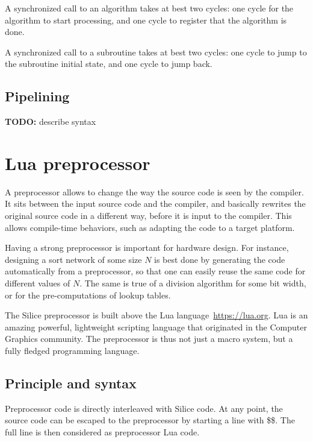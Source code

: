 \documentclass[a4]{article}
\newcommand\todo[1]{{\color{magenta}\textbf{TODO:} #1}}
\newcommand\silice{Silice}
\begin{document}
A synchronized call to an algorithm takes at best two cycles: one cycle for the algorithm to start processing, and one cycle to register that the algorithm is done.

A synchronized call to a subroutine takes at best two cycles: one cycle to jump to the subroutine initial state, and one cycle to jump back.


\subsection{Pipelining} 

\todo{describe syntax \ttfamily{\{ \} -> \{ \}}}


\section{Lua preprocessor}

A preprocessor allows to change the way the source code is seen by the compiler.
It sits between the input source code and the compiler, and basically rewrites the
original source code in a different way, before it is input to the compiler.
This allows compile-time behaviors, such as adapting the code to a target platform.

Having a strong preprocessor is important for hardware design. For instance,
designing a sort network of some size $N$ is best done by generating the code 
automatically from a preprocessor, so that one can easily reuse the
same code for different values of $N$. The same is true of a division 
algorithm for some bit width, or for the pre-computations of lookup tables.

The \silice{} preprocessor is built above the Lua language~\url{https://lua.org}. Lua is an amazing powerful, lightweight scripting language that originated in the Computer Graphics community. The preprocessor is thus not just a macro system, but a fully fledged programming language.

\subsection{Principle and syntax}

Preprocessor code is directly interleaved with Silice code. At any point, the source code can be escaped to the preprocessor by starting a line with \$\$. The full line is then considered as preprocessor Lua code. 
\end{document}
